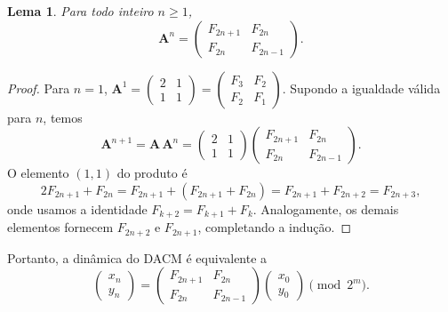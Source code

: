 \documentclass[12pt,a4paper]{article}
\newtheorem{lemma}[theorem]{Lema}
\begin{document}
\begin{lemma}\label{lem:fib}
Para todo inteiro \(n\ge 1\),
\[
\mathbf{A}^n = \begin{pmatrix}
F_{2n+1} & F_{2n} \\
F_{2n}   & F_{2n-1}
\end{pmatrix}.
\]
\end{lemma}
\begin{proof}
Para \(n=1\), \(\mathbf{A}^1 = \begin{pmatrix}2&1\\1&1\end{pmatrix} = \begin{pmatrix}F_3&F_2\\F_2&F_1\end{pmatrix}\). Supondo a igualdade válida para \(n\), temos
\[
\mathbf{A}^{n+1} = \mathbf{A}\,\mathbf{A}^n
= \begin{pmatrix}2&1\\1&1\end{pmatrix}
\begin{pmatrix}F_{2n+1}&F_{2n}\\F_{2n}&F_{2n-1}\end{pmatrix}.
\]
O elemento \((1,1)\) do produto é
\[
2F_{2n+1}+F_{2n} = F_{2n+1}+(F_{2n+1}+F_{2n}) = F_{2n+1}+F_{2n+2} = F_{2n+3},
\]
onde usamos a identidade \(F_{k+2}=F_{k+1}+F_k\). Analogamente, os demais elementos fornecem \(F_{2n+2}\) e \(F_{2n+1}\), completando a indução.
\end{proof}

Portanto, a dinâmica do DACM é equivalente a
\begin{equation}\label{eq:fibdacm}
\begin{pmatrix} x_n \\ y_n \end{pmatrix}
= \begin{pmatrix}
F_{2n+1} & F_{2n} \\
F_{2n}   & F_{2n-1}
\end{pmatrix}
\begin{pmatrix} x_0 \\ y_0 \end{pmatrix} \pmod{2^m}.
\end{equation}
\end{document}
